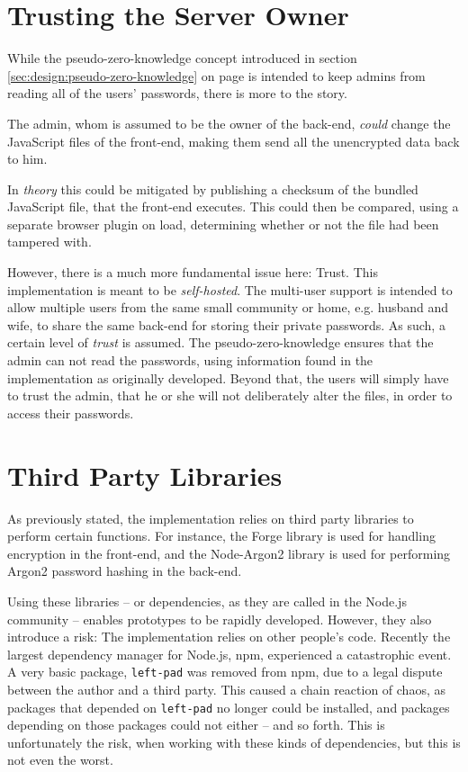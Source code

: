 	\section{Trusting the Server Owner}
		While the pseudo-zero-knowledge concept introduced in section \ref{sec:design:pseudo-zero-knowledge} on page \pageref{sec:design:pseudo-zero-knowledge} is intended to keep admins from reading all of the users' passwords, there is more to the story.

		The admin, whom is assumed to be the owner of the back-end, \emph{could} change the JavaScript files of the front-end, making them send all the unencrypted data back to him. 

		In \emph{theory} this could be mitigated by publishing a checksum of the bundled JavaScript file, that the front-end executes. This could then be compared, using a separate browser plugin on load, determining whether or not the file had been tampered with.

		However, there is a much more fundamental issue here: Trust. This implementation is meant to be \emph{self-hosted}. The multi-user support is intended to allow multiple users from the same small community or home, e.g. husband and wife, to share the same back-end for storing their private passwords. As such, a certain level of \emph{trust} is assumed. The pseudo-zero-knowledge ensures that the admin can not read the passwords, using information found in the implementation as originally developed. Beyond that, the users will simply have to trust the admin, that he or she will not deliberately alter the files, in order to access their passwords.

	\section{Third Party Libraries}
		As previously stated, the implementation relies on third party libraries to perform certain functions. For instance, the Forge library is used for handling encryption in the front-end, and the Node-Argon2 library is used for performing Argon2 password hashing in the back-end. 

		Using these libraries -- or dependencies, as they are called in the Node.js community -- enables prototypes to be rapidly developed. However, they also introduce a risk: The implementation relies on other people's code. Recently the largest dependency manager for Node.js, npm, experienced a catastrophic event. A very basic package, \verb=left-pad= was removed from npm, due to a legal dispute between the author and a third party\cite{npm_leftpad}. This caused a chain reaction of chaos, as packages that depended on \verb=left-pad= no longer could be installed, and packages depending on those packages could not either -- and so forth. This is unfortunately the risk, when working with these kinds of dependencies, but this is not even the worst.

